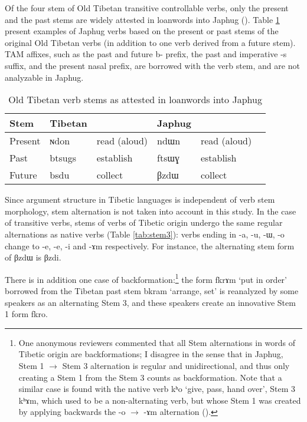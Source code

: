 \documentclass[oldfontcommands,oneside,a4paper,11pt]{article}
\newcommand{\ipa}[1]{{\phon \mbox{#1}}} %
\begin{document}
Of the four stem of Old Tibetan transitive controllable verbs, only the present and the past stems are widely attested in loanwords into Japhug (\citealt[138]{jacques04these}). Table  \ref{tab:four.stems} present examples of Japhug verbs based on the present or past stems of the original Old Tibetan verbs (in addition to one verb derived from a future stem). TAM affixes, such as the past and future \ipa{b-} prefix, the past and imperative \ipa{-s} suffix, and the present nasal prefix, are borrowed with the verb stem, and are not analyzable in Japhug.

\begin{table}[H]
\caption{Old Tibetan verb stems as attested in loanwords into Japhug} \label{tab:four.stems} \centering
\begin{tabular}{llllll}
\toprule
Stem&Tibetan && Japhug &\\
\midrule
Present & \ipa{ɴdon} & read (aloud) & \ipa{ndɯn} & read (aloud)&\\
Past  & \ipa{btsugs} & establish & \ipa{ftsɯɣ} &establish&\\
Future & \ipa{bsdu} & collect & \ipa{βzdɯ} & collect\\
\bottomrule
\end{tabular}
\end{table}

Since argument structure in Tibetic languages is independent of verb stem morphology, stem alternation is not taken into account in this study. In the case of transitive verbs, stems of verbs of Tibetic origin undergo the same regular alternations  as native verbs (Table \ref{tab:stem3}): verbs ending in \ipa{-a}, \ipa{-u}, \ipa{-ɯ}, \ipa{-o} change to \ipa{-e}, \ipa{-e}, \ipa{-i} and \ipa{-ɤm} respectively. For instance, the alternating stem form of \ipa{βzdɯ} is \ipa{βzdi}. 

There is in addition one case of backformation:\footnote{One anonymous reviewers commented that all Stem alternations in words of Tibetic origin are backformations; I disagree in the sense that in Japhug, Stem 1 $\rightarrow$ Stem 3 alternation is regular and unidirectional, and thus only creating a Stem 1 from the Stem 3 counts as backformation. Note that a similar case is found with the native verb \ipa{kʰo} `give, pass, hand over', Stem 3 \ipa{kʰɤm}, which used to be a non-alternating verb, but whose Stem 1 was created by applying backwards the \ipa{-o} $\rightarrow$ \ipa{-ɤm} alternation (\citealt{jacques14esquisse}).} the form \ipa{fkrɤm} `put in order' borrowed from the Tibetan past stem \ipa{bkram} `arrange, set' is reanalyzed by some speakers as an alternating Stem 3, and these speakers create an innovative Stem 1 form \ipa{fkro}. 
\end{document}
